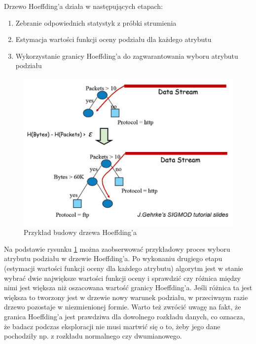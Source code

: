 \noindent Drzewo Hoeffding'a działa w następujących etapach: 

\begin{enumerate}
    \item Zebranie odpowiednich statystyk z próbki strumienia
    \item Estymacja wartości funkcji oceny podziału dla każdego atrybutu
    \item Wykorzystanie granicy Hoeffding'a do zagwarantowania wyboru atrybutu podziału
\end{enumerate}

\newpage

\begin{figure}[h] 
    \centering
    \includegraphics[width=15cm]{figures/hoeffding_tree.JPG}
    \caption{Przykład budowy drzewa Hoeffding'a \cite{Prezentacja:Strumienie}}\label{Figure:HoeffdingTree}
\end{figure}

\noindent Na podstawie rysunku \ref{Figure:HoeffdingTree} można zaobserwować przykładowy proces wyboru atrybutu podziału w drzewie Hoeffding'a. Po wykonaniu drugiego etapu (estymacji wartości funkcji oceny dla każdego atrybutu) algorytm jest w stanie wybrać dwie największe wartości funkcji oceny i sprawdzić czy różnica między nimi jest większa niż oszacowana wartość granicy Hoeffding'a. Jeśli różnica ta jest większa to tworzony jest w drzewie nowy warunek podziału, w przeciwnym razie drzewo pozostaje w niezmienionej formie. Warto też zwrócić uwagę na fakt, że granica Hoeffding'a jest prawdziwa dla dowolnego rozkładu danych, co oznacza, że badacz podczas eksploracji nie musi martwić się o to, żeby jego dane pochodziły np. z rozkładu normalnego czy dwumianowego.

